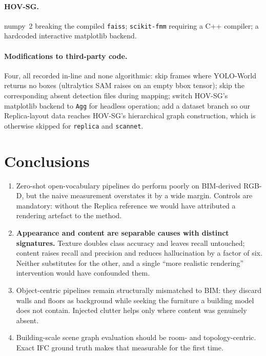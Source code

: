 \documentclass[11pt,a4paper]{article}
\begin{document}
\paragraph{HOV-SG.} numpy~2 breaking the compiled \texttt{faiss};
\texttt{scikit-fmm} requiring a C++ compiler; a hardcoded interactive
matplotlib backend.

\paragraph{Modifications to third-party code.} Four, all recorded in-line and
none algorithmic: skip frames where YOLO-World returns no boxes (ultralytics
SAM raises on an empty bbox tensor); skip the corresponding absent detection
files during mapping; switch HOV-SG's matplotlib backend to \texttt{Agg} for
headless operation; add a dataset branch so our Replica-layout data reaches
HOV-SG's hierarchical graph construction, which is otherwise skipped for
\texttt{replica} and \texttt{scannet}.

\section{Conclusions}

\begin{enumerate}
\item Zero-shot open-vocabulary pipelines do perform poorly on BIM-derived
RGB-D, but the naive measurement overstates it by a wide margin. Controls are
mandatory: without the Replica reference we would have attributed a rendering
artefact to the method.
\item \textbf{Appearance and content are separable causes with distinct
signatures.} Texture doubles class accuracy and leaves recall untouched; content
raises recall and precision and reduces hallucination by a factor of six.
Neither substitutes for the other, and a single ``more realistic rendering''
intervention would have confounded them.
\item Object-centric pipelines remain structurally mismatched to BIM: they
discard walls and floors as background while seeking the furniture a building
model does not contain. Injected clutter helps only where content was genuinely
absent.
\item Building-scale scene graph evaluation should be room- and
topology-centric. Exact IFC ground truth makes that measurable for the first
time.
\end{enumerate}
\end{document}
